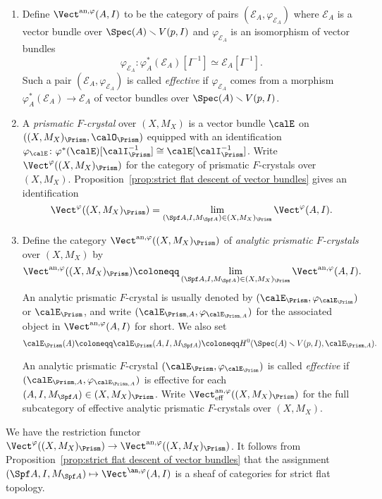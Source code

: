 \begin{defn}
\begin{enumerate}
    \item  Define $\Vect^{\mathrm{an},\varphi}(A,I)$ to be the category of pairs $(\mathcal{E}_A, \varphi_{\mathcal{E}_A})$ where $\mathcal{E}_A$ is a vector bundle over $\Spec(A)\smallsetminus V(p,I)$ and $\varphi_{\mathcal{E}_A}$ is an isomorphism of vector bundles
\[
    \varphi_{\mathcal{E}_A}\colon \varphi_A^\ast(\mathcal{E}_A)[I^{-1}] \simeq \mathcal{E}_A[I^{-1}].
\]
Such a pair $(\mathcal{E}_A,\varphi_{\mathcal{E}_A})$ is called \emph{effective} if $\varphi_{\mathcal{E}_A}$ comes from a morphism $\varphi_A^\ast(\mathcal{E}_A) \to \mathcal{E}_A$ of vector bundles over $\Spec(A)\smallsetminus V(p,I)$. 
  \item
A \emph{prismatic $F$-crystal} over $(X,M_X)$ is a vector bundle $\calE$ on $((X,M_X)_\Prism,\calO_\Prism)$ equipped with an identification $\varphi_\calE\colon \varphi^\ast(\calE)[\calI_\Prism^{-1}]\cong \calE[\calI_\Prism^{-1}]$. Write $\Vect^{\varphi}((X,M_X)_\Prism)$ for the category of prismatic $F$-crystals over $(X,M_X)$. Proposition~\ref{prop:strict flat descent of vector bundles} gives an identification
\[
\Vect^{\varphi}((X,M_X)_\Prism)=\lim_{(\Spf A,I,M_{\Spf A})\in (X,M_X)_\Prism} \Vect^{\varphi}(A,I).
 \]    
    \item Define the category $\Vect^{\mathrm{an},\varphi}((X,M_X)_\Prism)$ of \emph{analytic prismatic $F$-crystals}  over $(X,M_X)$ by
\[
\Vect^{\mathrm{an},\varphi}((X,M_X)_\Prism)\coloneqq\lim_{(\Spf A,I,M_{\Spf A})\in (X,M_X)_\Prism} \Vect^{\mathrm{an},\varphi}(A,I).
 \]
 An analytic prismatic $F$-crystal is usually denoted by $(\calE_\Prism,\varphi_{\calE_\Prism})$ or $\calE_\Prism$, and write $(\calE_{\Prism,A},\varphi_{\calE_{\Prism,A}})$ for the associated object in $\Vect^{\mathrm{an},\varphi}(A,I)$ for short. We also set
 \[
 \calE_{\Prism}(A)\coloneqq \calE_{\Prism}(A,I,M_{\Spf A})\coloneqq H^0(\Spec(A)\smallsetminus V(p,I),\calE_{\Prism,A}).
 \]
 
 An analytic prismatic $F$-crystal $(\calE_\Prism,\varphi_{\calE_\Prism})$ is called \emph{effective} if $(\calE_{\Prism,A},\varphi_{\calE_{\Prism,A}})$ is effective for each $(A, I, M_{\Spf A}) \in (X,M_X)_{\Prism}$. Write $\Vect^{\mathrm{an},\varphi}_{\mathrm{eff}}((X,M_X)_\Prism)$ for the full subcategory of effective analytic prismatic $F$-crystals over $(X,M_X)$.
\end{enumerate}
\end{defn}

We have the restriction functor $\Vect^{\varphi}((X,M_X)_\Prism)\rightarrow \Vect^{\mathrm{an},\varphi}((X,M_X)_\Prism)$. 
It follows from Proposition~\ref{prop:strict flat descent of vector bundles} that the assignment $(\Spf A,I,M_{\Spf A})\mapsto \Vect^{\an,\varphi}(A,I)$ is a sheaf of categories for strict flat topology.

